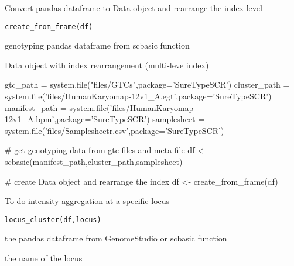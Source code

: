 \documentclass[a4paper]{book}
\begin{document}
%
\begin{Description}\relax
Convert pandas dataframe to Data object and rearrange the index level
\end{Description}
%
\begin{Usage}
\begin{verbatim}
create_from_frame(df)
\end{verbatim}
\end{Usage}
%
\begin{Arguments}
\begin{ldescription}
\item[\code{df}] genotyping pandas dataframe from scbasic function

\end{ldescription}
\end{Arguments}
%
\begin{Value}
Data object with index rearrangement (multi-leve index)

\end{Value}
%
\begin{Examples}
\begin{ExampleCode}

gtc_path = system.file("files/GTCs",package='SureTypeSCR')
cluster_path = system.file('files/HumanKaryomap-12v1_A.egt',package='SureTypeSCR')
manifest_path = system.file('files/HumanKaryomap-12v1_A.bpm',package='SureTypeSCR')
samplesheet = system.file('files/Samplesheetr.csv',package='SureTypeSCR')

# get genotyping data from gtc files and meta file
df <- scbasic(manifest_path,cluster_path,samplesheet)


# create Data object and rearrange the index
df <- create_from_frame(df)


\end{ExampleCode}
\end{Examples}
%
\begin{Description}\relax
To do intensity aggregation at a specific locus
\end{Description}
%
\begin{Usage}
\begin{verbatim}
locus_cluster(df,locus)
\end{verbatim}
\end{Usage}
%
\begin{Arguments}
\begin{ldescription}
\item[\code{df}] the pandas dataframe from GenomeStudio or scbasic function
\item[\code{locus}] the name of the locus
\end{ldescription}
\end{Arguments}
\end{document}
